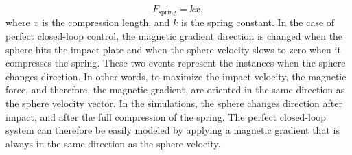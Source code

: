 \documentclass[letterpaper, 10 pt, conference]{ieeeconf}  %
\begin{document}
\begin{equation}
F_{\text{spring}}=k x,
\label{spring_force}
\end{equation}
where $x$ is the compression length, and $k$ is the spring constant. In the case of perfect closed-loop control, the magnetic gradient direction is changed when the sphere hits the impact plate and when the sphere velocity slows to zero when it compresses the spring. These two events represent the instances when the sphere changes direction. In other words, to maximize the impact velocity, the magnetic force, and therefore, the magnetic gradient, are oriented in the same direction as the sphere velocity vector. In the simulations, the sphere changes direction after impact, and after the full compression of the spring. The perfect closed-loop system can therefore be easily modeled by applying a magnetic gradient that is always in the same direction as the sphere velocity.
\end{document}
